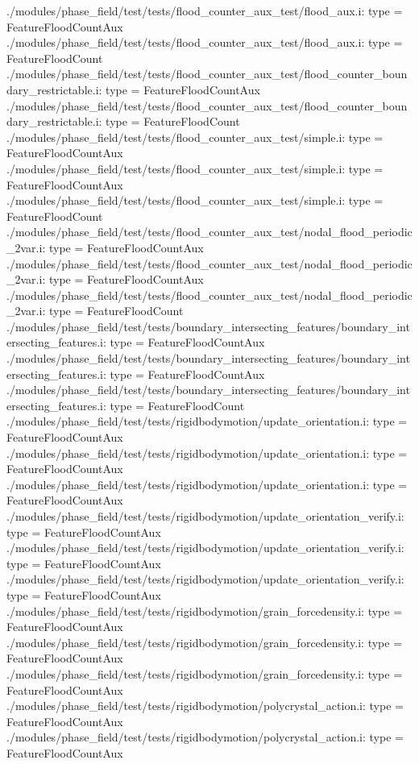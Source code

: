 ./modules/phase_field/test/tests/flood_counter_aux_test/flood_aux.i:    type = FeatureFloodCountAux
./modules/phase_field/test/tests/flood_counter_aux_test/flood_aux.i:    type = FeatureFloodCount
./modules/phase_field/test/tests/flood_counter_aux_test/flood_counter_boundary_restrictable.i:    type = FeatureFloodCountAux
./modules/phase_field/test/tests/flood_counter_aux_test/flood_counter_boundary_restrictable.i:    type = FeatureFloodCount
./modules/phase_field/test/tests/flood_counter_aux_test/simple.i:    type = FeatureFloodCountAux
./modules/phase_field/test/tests/flood_counter_aux_test/simple.i:    type = FeatureFloodCountAux
./modules/phase_field/test/tests/flood_counter_aux_test/simple.i:    type = FeatureFloodCount
./modules/phase_field/test/tests/flood_counter_aux_test/nodal_flood_periodic_2var.i:    type = FeatureFloodCountAux
./modules/phase_field/test/tests/flood_counter_aux_test/nodal_flood_periodic_2var.i:    type = FeatureFloodCountAux
./modules/phase_field/test/tests/flood_counter_aux_test/nodal_flood_periodic_2var.i:    type = FeatureFloodCount
./modules/phase_field/test/tests/boundary_intersecting_features/boundary_intersecting_features.i:    type = FeatureFloodCountAux
./modules/phase_field/test/tests/boundary_intersecting_features/boundary_intersecting_features.i:    type = FeatureFloodCountAux
./modules/phase_field/test/tests/boundary_intersecting_features/boundary_intersecting_features.i:    type = FeatureFloodCount
./modules/phase_field/test/tests/rigidbodymotion/update_orientation.i:    type = FeatureFloodCountAux
./modules/phase_field/test/tests/rigidbodymotion/update_orientation.i:    type = FeatureFloodCountAux
./modules/phase_field/test/tests/rigidbodymotion/update_orientation.i:    type = FeatureFloodCountAux
./modules/phase_field/test/tests/rigidbodymotion/update_orientation_verify.i:    type = FeatureFloodCountAux
./modules/phase_field/test/tests/rigidbodymotion/update_orientation_verify.i:    type = FeatureFloodCountAux
./modules/phase_field/test/tests/rigidbodymotion/update_orientation_verify.i:    type = FeatureFloodCountAux
./modules/phase_field/test/tests/rigidbodymotion/grain_forcedensity.i:    type = FeatureFloodCountAux
./modules/phase_field/test/tests/rigidbodymotion/grain_forcedensity.i:    type = FeatureFloodCountAux
./modules/phase_field/test/tests/rigidbodymotion/grain_forcedensity.i:    type = FeatureFloodCountAux
./modules/phase_field/test/tests/rigidbodymotion/polycrystal_action.i:    type = FeatureFloodCountAux
./modules/phase_field/test/tests/rigidbodymotion/polycrystal_action.i:    type = FeatureFloodCountAux
